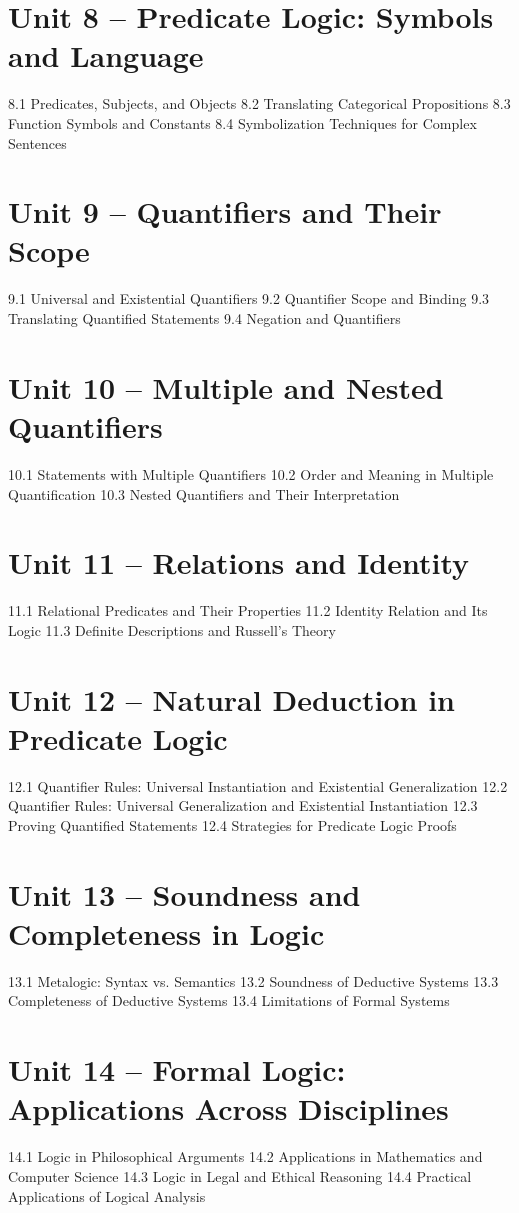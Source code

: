 \section{Unit 8 – Predicate Logic: Symbols and Language}
8.1 Predicates, Subjects, and Objects
8.2 Translating Categorical Propositions
8.3 Function Symbols and Constants
8.4 Symbolization Techniques for Complex Sentences
\section{Unit 9 – Quantifiers and Their Scope}
9.1 Universal and Existential Quantifiers
9.2 Quantifier Scope and Binding
9.3 Translating Quantified Statements
9.4 Negation and Quantifiers
\section{Unit 10 – Multiple and Nested Quantifiers}
10.1 Statements with Multiple Quantifiers
10.2 Order and Meaning in Multiple Quantification
10.3 Nested Quantifiers and Their Interpretation
\section{Unit 11 – Relations and Identity}
11.1 Relational Predicates and Their Properties
11.2 Identity Relation and Its Logic
11.3 Definite Descriptions and Russell's Theory
\section{Unit 12 – Natural Deduction in Predicate Logic}
12.1 Quantifier Rules: Universal Instantiation and Existential Generalization
12.2 Quantifier Rules: Universal Generalization and Existential Instantiation
12.3 Proving Quantified Statements
12.4 Strategies for Predicate Logic Proofs
\section{Unit 13 – Soundness and Completeness in Logic}
13.1 Metalogic: Syntax vs. Semantics
13.2 Soundness of Deductive Systems
13.3 Completeness of Deductive Systems
13.4 Limitations of Formal Systems
\section{Unit 14 – Formal Logic: Applications Across Disciplines}
14.1 Logic in Philosophical Arguments
14.2 Applications in Mathematics and Computer Science
14.3 Logic in Legal and Ethical Reasoning
14.4 Practical Applications of Logical Analysis


